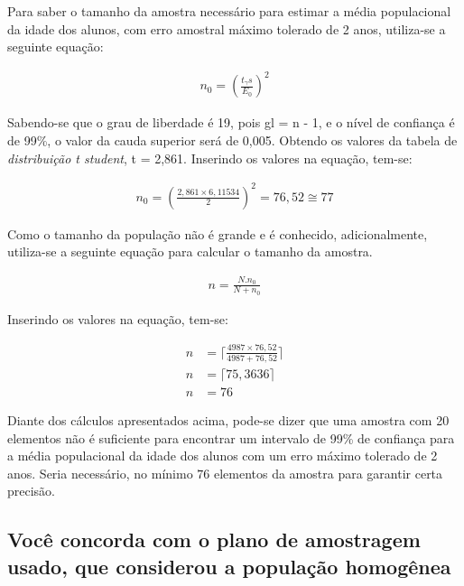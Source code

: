 	Para saber o tamanho da amostra necessário para estimar a média
	populacional da idade dos alunos, com erro amostral máximo tolerado de 2
	anos, utiliza-se a seguinte equação:

	\begin{align*}
		 n_0 = \left (\frac{t_\gamma s}{E_0} \right)^2
	\end{align*}

	Sabendo-se que o grau de liberdade é 19, pois gl = n - 1, e o nível de
	confiança é de 99\%, o valor da cauda superior será de 0,005. Obtendo os
	valores da tabela de \textit{distribuição t student}, t = 2,861.
	Inserindo os valores na equação, tem-se:

	\begin{align*}
		n_0 = \left (\frac{2,861 \times 6,11534}{2} \right)^2 = 76,52 \cong 77
	\end{align*}

	Como o tamanho da população não é grande e é conhecido, adicionalmente,
	utiliza-se a seguinte equação para calcular o tamanho da amostra.

	\begin{align*}
		n = \frac{N . n_0}{N + n_0}
	\end{align*}

	Inserindo os valores na equação, tem-se:

	\begin{align*}
		n &= \lceil \frac{4987 \times 76,52}{4987 + 76,52} \rceil \\
		n &= \lceil 75,3636 \rceil \\
		n &= 76
	\end{align*}

	Diante dos cálculos apresentados acima, pode-se dizer que uma amostra
	com 20 elementos não é suficiente para encontrar um intervalo de 99\% de
	confiança para a média populacional da idade dos alunos com um erro
	máximo tolerado de 2 anos. Seria necessário, no mínimo $76$ elementos da
	amostra para garantir certa precisão. 

\subsection{Você concorda com o plano de amostragem usado, que considerou a população homogênea}

